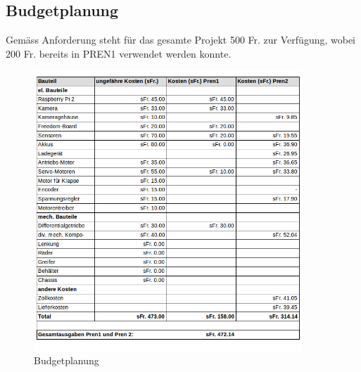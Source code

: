 \subsection{Budgetplanung}
Gemäss Anforderung steht für das gesamte Projekt 500 Fr. zur Verfügung, wobei 200 Fr. bereits in PREN1 verwendet werden konnte.
\begin{figure}[H]%
\centering
\includegraphics[width=0.9\textwidth]{04_Projektmanagement/fig/budgetplanung.png}
\caption{Budgetplanung}
\label{fig:scrumBoard}
\end{figure}

